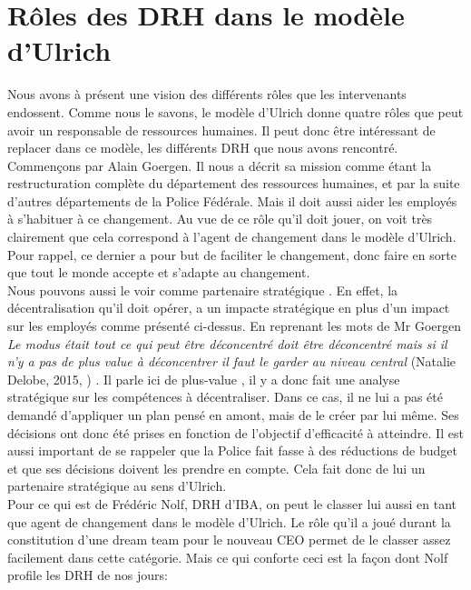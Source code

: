 \section{Rôles des DRH dans le modèle d'Ulrich}

Nous avons à présent une vision des différents rôles que les intervenants endossent. Comme nous le savons, le modèle d'Ulrich donne quatre rôles que peut avoir un responsable de ressources humaines. Il peut donc être intéressant de replacer dans ce modèle, les différents DRH que nous avons rencontré. \\

Commençons par Alain Goergen. Il nous a décrit sa mission comme étant la restructuration complète du département des ressources humaines, et par la suite d'autres départements de la Police Fédérale. Mais il doit aussi aider les employés à s'habituer à ce changement. Au vue de ce rôle qu'il doit jouer, on voit très clairement que cela correspond à l'\og agent de changement \fg{} dans le modèle d'Ulrich. Pour rappel, ce dernier a pour but de faciliter le changement, donc faire en sorte que tout le monde accepte et s'adapte au changement.\\

Nous pouvons aussi le voir comme \og partenaire stratégique \fg{}. En effet, la décentralisation qu'il doit opérer, a un impacte stratégique en plus d'un impact sur les employés comme présenté ci-dessus. En reprenant les mots de Mr Goergen \textit{\og Le modus était tout ce qui peut être déconcentré doit être déconcentré mais si il n’y a pas de plus value à déconcentrer il faut le garder au niveau central \fg{}} (Natalie Delobe, 2015, \cite{tableronde}) . Il parle ici de \og plus-value \fg{}, il y a donc fait une analyse stratégique sur les compétences à décentraliser. Dans ce cas, il ne lui a pas été demandé d'appliquer un plan pensé en amont, mais de le créer par lui même. Ses décisions ont donc été prises en fonction de l'objectif d'efficacité à atteindre. Il est aussi important de se rappeler que la Police fait fasse à des réductions de budget et que ses décisions doivent les prendre en compte. Cela fait donc de lui un \og partenaire stratégique \fg{} au sens d'Ulrich.\\   

Pour ce qui est de Frédéric Nolf, DRH d'IBA, on peut le classer lui aussi en tant que \og agent de changement \fg{} dans le modèle d'Ulrich. Le rôle qu'il a joué durant la constitution d'une \og{}dream team\fg{} pour le nouveau CEO permet de le classer assez facilement dans cette catégorie. Mais ce qui conforte ceci est la façon dont Nolf profile les DRH de nos jours:\newline

